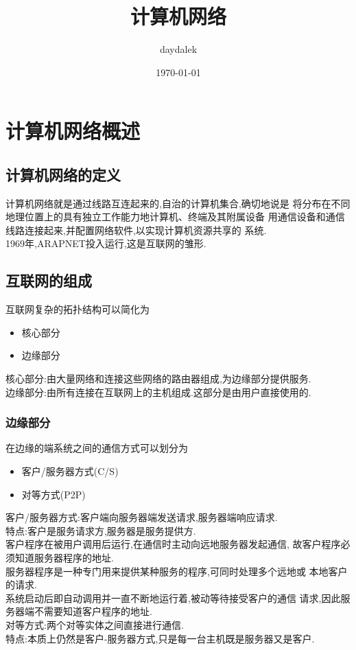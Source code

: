 \documentclass{ctexart}
\begin{document}
\title{计算机网络}
\author{daydalek}
\date{\today}
\maketitle
\section{计算机网络概述}
\subsection{计算机网络的定义}
计算机网络就是通过线路互连起来的,自治的计算机集合,确切地说是
将分布在不同地理位置上的具有独立工作能力地计算机、终端及其附属设备
用通信设备和通信线路连接起来,并配置网络软件,以实现计算机资源共享的
系统.\\
1969年,ARAPNET投入运行,这是互联网的雏形.
\subsection{互联网的组成}
互联网复杂的拓扑结构可以简化为\\
\begin{itemize}
    \item 核心部分
    \item 边缘部分
\end{itemize}
核心部分:由大量网络和连接这些网络的路由器组成,为边缘部分提供服务.\\
边缘部分:由所有连接在互联网上的主机组成.这部分是由用户直接使用的.\\
\subsubsection{边缘部分}
在边缘的端系统之间的通信方式可以划分为
\begin{itemize}
    \item 客户/服务器方式(C/S)
    \item 对等方式(P2P)
\end{itemize}
客户/服务器方式:客户端向服务器端发送请求,服务器端响应请求.\\
特点:客户是服务请求方,服务器是服务提供方.\\
客户程序在被用户调用后运行,在通信时主动向远地服务器发起通信,
故客户程序必须知道服务器程序的地址.\\
服务器程序是一种专门用来提供某种服务的程序,可同时处理多个远地或
本地客户的请求.\\
系统启动后即自动调用并一直不断地运行着,被动等待接受客户的通信
请求,因此服务器端不需要知道客户程序的地址.\\
对等方式:两个对等实体之间直接进行通信.\\
特点:本质上仍然是客户-服务器方式,只是每一台主机既是服务器又是客户.\\
\end{document}
